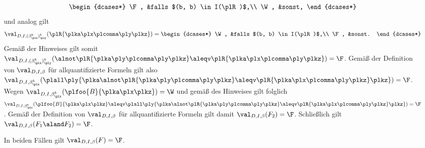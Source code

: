 \documentclass[12pt]{article}
\newcommand{\plB}{\plfoo{B}}
\begin{document}
\begin{loesung}
\begin{description}
\begin{align*}
\begin{dcases*}
                          \F, &falls $(b, b) \in I(\plR)$,\\
                          \W, &sonst,
                        \end{dcases*}
                   \end{align*}
                   und analog gilt
                   \begin{equation*}
                     \val_{D, I, (\beta_{\plx}^b)_{\ply}^b}(\plR{\plka \plx \plcomma \ply \plkz})
                     = \begin{dcases*}
                         \W, &falls $(b, b) \in I(\plR)$,\\
                         \F, &sonst.
                       \end{dcases*}
                   \end{equation*}
                   Gemäß der Hinweises gilt somit $\val_{D, I, (\beta_{\plx}^b)_{\ply}^b}(\alnot \plR{\plka \ply \plcomma \ply \plkz} \aleqv \plR{\plka \plx \plcomma \ply \plkz}) = \F$. Gemäß der Definition von $\val_{D, I, \beta}$ für allquantifizierte Formeln gilt also $\val_{D, I, \beta_{\plx}^b}(\plall \ply {\plka \alnot \plR{\plka \ply \plcomma \ply \plkz} \aleqv \plR{\plka \plx \plcomma \ply \plkz} \plkz}) = \F$. Wegen $\val_{D, I, \beta_{\plx}^b}(\plB{\plka \plx \plkz}) = \W$ und gemäß des Hinweises gilt folglich $\val_{D, I, \beta_{\plx}^b}(\plB{\plka \plx \plkz} \aleqv \plall \ply {\plka \alnot \plR{\plka \ply \plcomma \ply \plkz} \aleqv \plR{\plka \plx \plcomma \ply \plkz} \plkz}) = \F$. Gemäß der Definition von $\val_{D, I, \beta}$ für allquantifizierte Formeln gilt damit $\val_{D, I, \beta}(F_2) = \F$. Schließlich gilt $\val_{D, I, \beta}(F_1 \aland F_2) = \F$.
  \end{description}
  In beiden Fällen gilt $\val_{D, I, \beta}(F) = \F$.
\end{loesung}

\end{document}
